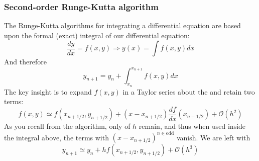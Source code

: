 \documentclass[hyperref={colorlinks=true}]{beamer}
\begin{document}

\begin{frame}%
  \frametitle{Second-order Runge-Kutta algorithm} 

  The Runge-Kutta algorithms for integrating a differential equation are based upon the formal (exact) integral of our differential equation:
  \begin{equation}
    \frac{dy}{dx} = f(x,y) \Rightarrow y(x) = \int f(x,y) dx
  \end{equation}
  And therefore
  \begin{equation}
    y_{n+1} = y_{n} + \int_{x_n}^{x_{n+1}} f(x,y) dx
  \end{equation}
  The key insight is to expand $f(x,y)$ in a Taylor series about the  and retain two
terms:
  \begin{equation}
    f(x,y) \simeq f(x_{n+1/2} , y_{n+1/2}) + (x - x_{n+1/2}) \frac{df}{dx}(x_{n+1/2}) + \mathcal{O}(h^2)
  \end{equation}
  As you recall from the  algorithm, only  of $h$ remain, and thus when used inside the integral above, the terms with $(x - x_{n+1/2})^{n\in\mathrm{odd}}$ vanish. We are left with
  \begin{equation}
    y_{n+1} \simeq y_{n} + h f(x_{n+1/2} , y_{n+1/2}) + \mathcal{O}(h^3) 
  \end{equation}

\end{frame}

\end{document}
